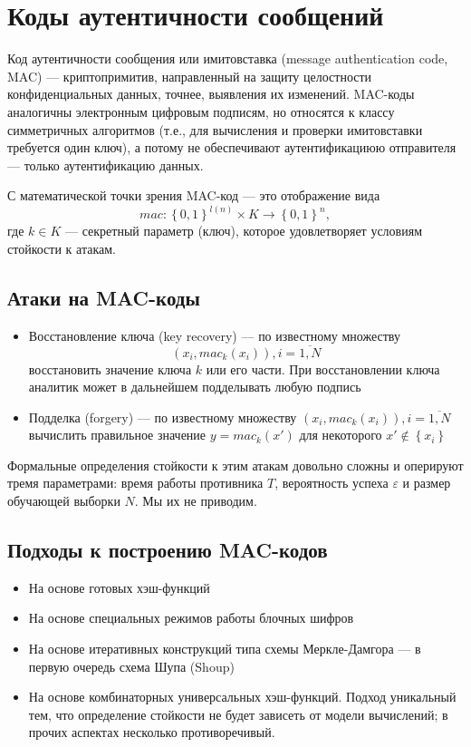 \chapter{Коды аутентичности сообщений}

Код аутентичности сообщения или имитовставка (message authentication code, MAC)
--- криптопримитив, направленный на защиту целостности конфиденциальных данных,
точнее, выявления их изменений.
MAC-коды аналогичны электронным цифровым подписям, но относятся к классу
симметричных алгоритмов (т.е., для вычисления и проверки имитовставки требуется
один ключ), а потому не обеспечивают аутентификациюю отправителя --- только
аутентификацию данных.

С математической точки зрения MAC-код --- это отображение вида
\begin{equation*}
  mac: \left\{ 0, 1 \right\}^{l\left( n \right)} \times K
  \rightarrow \left\{ 0, 1 \right\}^n,
\end{equation*}
где $k \in K$ --- секретный параметр (ключ), которое удовлетворяет условиям
стойкости к атакам.

\section{Атаки на MAC-коды}
\begin{itemize}
  \item
    Восстановление ключа (key recovery) --- по известному множеству
    \begin{equation*}
      \left( x_i, mac_k\left( x_i \right) \right), i=\overline{1,N}
    \end{equation*}
    восстановить значение ключа $k$ или его части.
    При восстановлении ключа аналитик может в дальнейшем подделывать любую
    подпись
  \item
    Подделка (forgery) --- по известному множеству
    $\left( x_i, mac_k\left( x_i \right) \right), i=\overline{1,N}$
    вычислить правильное значение $y=mac_k\left( x' \right)$ для
    некоторого $x' \notin \left\{ x_i \right\}$
\end{itemize}

Формальные определения стойкости к этим атакам довольно сложны и оперируют
тремя параметрами: время работы противника $T$, вероятность успеха
$\varepsilon$ и размер обучающей выборки $N$.
Мы их не приводим.

\section{Подходы к построению MAC-кодов}
\begin{itemize}
  \item На основе готовых хэш-функций
  \item На основе специальных режимов работы блочных шифров
  \item На основе итеративных конструкций типа схемы Меркле-Дамгора
    --- в первую очередь схема Шупа (Shoup)
  \item На основе комбинаторных универсальных хэш-функций.
    Подход уникальный тем, что определение стойкости не будет зависеть от
    модели вычислений; в прочих аспектах несколько противоречивый.
\end{itemize}


